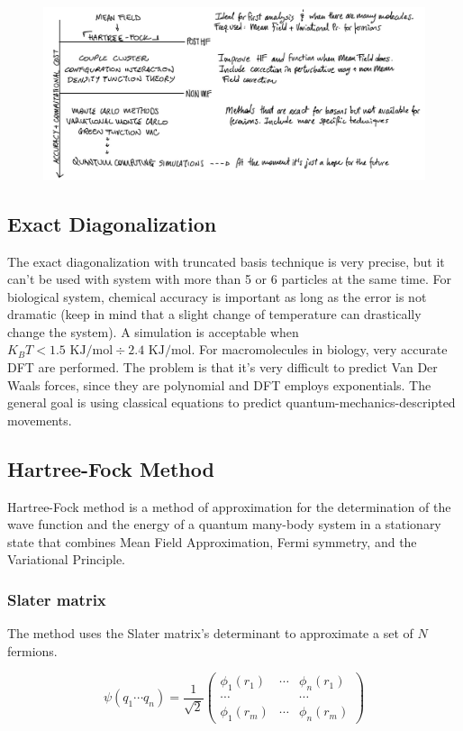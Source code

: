 \begin{figure}[htbp!]
	\centering
	\includegraphics[scale=0.30]{img_13}
\end{figure}

	\subsection{Exact Diagonalization}
	The exact diagonalization with truncated basis technique is very precise, but it can't be used with system with more than 5 or 6 particles at the same time.
	For biological system, chemical accuracy is important as long as the error is not dramatic (keep in mind that a slight change of temperature can drastically change the system).
	A simulation is acceptable when $K_BT < 1.5\text{ KJ/mol} \div 2.4 \text{ KJ/mol}$.
	For macromolecules in biology, very accurate DFT are performed.
	The problem is that it's very difficult to predict Van Der Waals forces, since they are polynomial and DFT employs exponentials.
	The general goal is using classical equations to predict quantum-mechanics-descripted movements.

	\subsection{Hartree-Fock Method}
	Hartree-Fock method is a method of approximation for the determination of the wave function and the energy of a quantum many-body system in a stationary state that combines Mean Field Approximation, Fermi symmetry, and the Variational Principle.

		\subsubsection{Slater matrix}
		The method uses the Slater matrix's determinant to approximate a set of $N$ fermions.

		$$\psi(q_1\cdots q_n)=\frac{1}{\sqrt{2}}\begin{pmatrix}\phi_1(r_1)&\cdots&\phi_n(r_1)\\\cdots & &\cdots\\\phi_1(r_m)&\cdots&\phi_n(r_m)\end{pmatrix}$$

